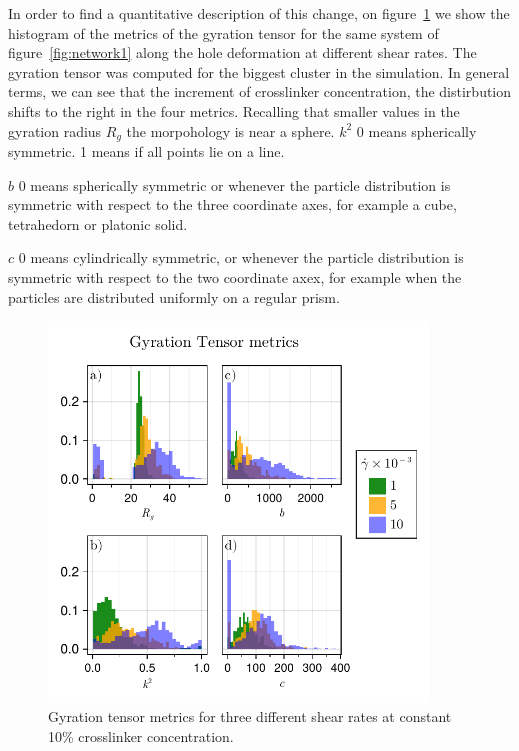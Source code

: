 In order to find a quantitative description of this change, on figure~\ref{fig:network2} we show the histogram of the metrics of the gyration tensor for the same system of figure~\ref{fig:network1} along the hole deformation at different shear rates.
The gyration tensor was computed for the biggest cluster in the simulation.
In general terms, we can see that the increment of crosslinker concentration, the distirbution shifts to the right in the four metrics.
Recalling that smaller values in the gyration radius $R_g$ the morpohology is near a sphere.
$k^2$ \num{0} means spherically symmetric.
\num{1} means if all points lie on a line.

$b$ \num{0} means spherically symmetric or whenever the particle distribution is symmetric with respect to the three coordinate axes, for example a cube, tetrahedorn or platonic solid.

$c$ \num{0} means cylindrically symmetric, or whenever the particle distribution is symmetric with respect to the two coordinate axex, for example when the particles are distributed uniformly on a regular prism.

\begin{figure}[ht!]
    \centering
    \includegraphics[width=0.9\textwidth]{figs/ComputaitonalResults/metricsGyrationTensor.pdf}
    \caption{Gyration tensor metrics for three different shear rates at constant \num{10}\% crosslinker concentration.}\label{fig:network2}
\end{figure}





